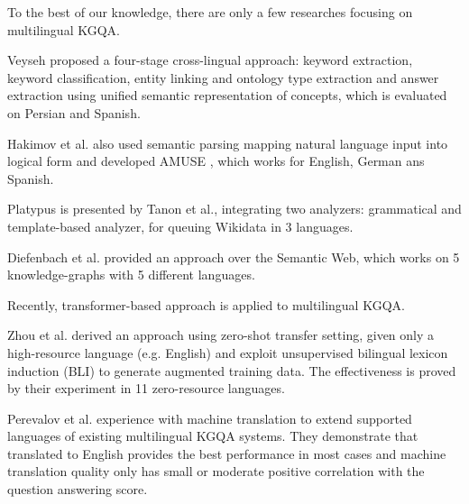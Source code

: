 To the best of our knowledge, there are only a few researches focusing on multilingual KGQA. 

Veyseh \cite{pouran-ben-veyseh-2016-cross} proposed a four-stage cross-lingual approach: 
keyword extraction, keyword classification, entity linking and ontology type extraction 
and answer extraction using unified semantic representation of concepts, 
which is evaluated on Persian and Spanish.

Hakimov et al. also used semantic parsing mapping natural language input into logical form 
and developed AMUSE \cite{AMUSE}, which works for English, German ans Spanish. 

Platypus \cite{10.1007/978-3-319-98192-5_21} is presented by Tanon et al., 
integrating two analyzers: grammatical and template-based analyzer, for queuing Wikidata in 3 languages. 

Diefenbach et al. \cite{https://doi.org/10.48550/arxiv.1803.00832} provided an approach over the Semantic Web, 
which works on 5 knowledge-graphs with 5 different languages. 

Recently, transformer-based approach is applied to multilingual KGQA.

Zhou et al. \cite{zhou-etal-2021-improving} derived an approach using zero-shot transfer setting, 
given only a high-resource language (e.g. English) 
and exploit unsupervised bilingual lexicon induction (BLI) to generate augmented training data. 
The effectiveness is proved by their experiment in 11 zero-resource languages. 

Perevalov et al. \cite{MT-KGQA} experience with machine translation 
to extend supported languages of existing multilingual KGQA systems. 
They demonstrate that translated to English provides the best performance in most cases 
and machine translation quality only has small or moderate positive correlation with the question answering score. 